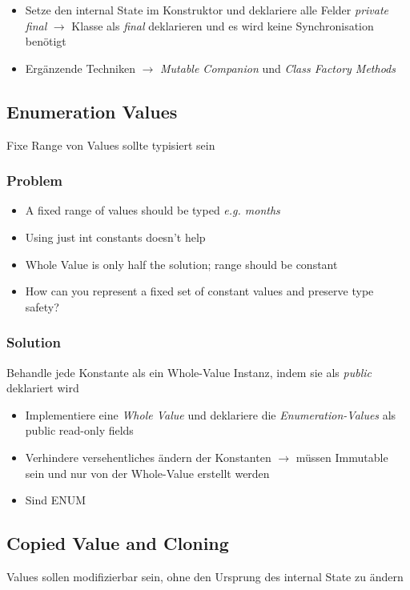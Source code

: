 \begin{itemize}
    \item Setze den internal State im Konstruktor und deklariere alle Felder \textit{private final} $\rightarrow$ Klasse als \textit{final} deklarieren und es wird keine Synchronisation benötigt
    \item Ergänzende Techniken $\rightarrow$ \textit{Mutable Companion} und \textit{Class Factory Methods}
\end{itemize}

\subsection{Enumeration Values}
Fixe Range von Values sollte typisiert sein

\subsubsection{Problem}
\begin{itemize}
    \item A fixed range of values should be typed \textit{e.g. months}
    \item Using just int constants doesn't help
    \item Whole Value is only half the solution; range should be constant
    \item How can you represent a fixed set of constant values and preserve type safety?
\end{itemize}
\subsubsection{Solution}
Behandle jede Konstante als ein Whole-Value Instanz, indem sie als \textit{public} deklariert wird
\begin{itemize}
    \item Implementiere eine \textit{Whole Value} und deklariere die \textit{Enumeration-Values} als public read-only fields
    \item Verhindere versehentliches ändern der Konstanten $\rightarrow$ müssen Immutable sein und nur von der Whole-Value erstellt werden
    \item Sind ENUM
\end{itemize}

\subsection{Copied Value and Cloning}
Values sollen modifizierbar sein, ohne den Ursprung des internal State zu ändern
